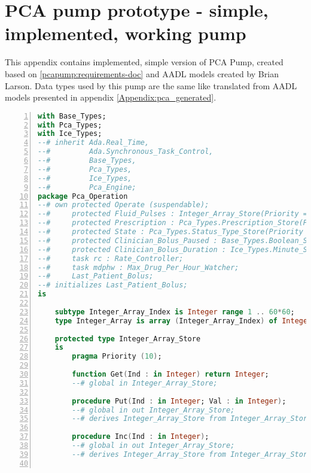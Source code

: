 
\cleardoublepage

\chapter{PCA pump prototype - simple, implemented, working pump}
\label{Appendix:pca_ravenscar}

This appendix contains implemented, simple version of PCA Pump, created based on \ref{pcapump:requirements-doc} and AADL models created by Brian Larson. Data types used by this pump are the same like translated from AADL models presented in appendix \ref{Appendix:pca_generated}.

\singlespacing
\begin{lstlisting}[language=ada, gobble=0, numbers=left, caption={\lstinline{Pca_Operation} package}, label={listing:pca_ravenscar:pca_operation}]
with Base_Types;
with Pca_Types;
with Ice_Types;
--# inherit Ada.Real_Time,
--#         Ada.Synchronous_Task_Control,
--#         Base_Types,
--#         Pca_Types,
--#         Ice_Types,
--#         Pca_Engine;
package Pca_Operation
--# own protected Operate (suspendable);
--#     protected Fluid_Pulses : Integer_Array_Store(Priority => 10);
--#     protected Prescription : Pca_Types.Prescription_Store(Priority => 10);
--#     protected State : Pca_Types.Status_Type_Store(Priority => 10);
--#     protected Clinician_Bolus_Paused : Base_Types.Boolean_Store(Priority => 10);
--#     protected Clinician_Bolus_Duration : Ice_Types.Minute_Store(Priority => 10);
--#     task rc : Rate_Controller;
--#     task mdphw : Max_Drug_Per_Hour_Watcher;
--#     Last_Patient_Bolus;
--# initializes Last_Patient_Bolus;
is

    subtype Integer_Array_Index is Integer range 1 .. 60*60;
    type Integer_Array is array (Integer_Array_Index) of Integer;

    protected type Integer_Array_Store
    is
        pragma Priority (10);

        function Get(Ind : in Integer) return Integer;
        --# global in Integer_Array_Store;

        procedure Put(Ind : in Integer; Val : in Integer);
        --# global in out Integer_Array_Store;
        --# derives Integer_Array_Store from Integer_Array_Store, Ind, Val;

        procedure Inc(Ind : in Integer);
        --# global in out Integer_Array_Store;
        --# derives Integer_Array_Store from Integer_Array_Store, Ind;


\end{lstlisting}
